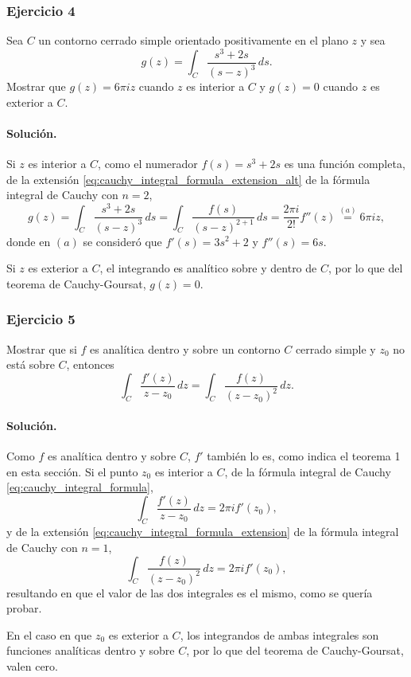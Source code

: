 \documentclass[a4paper]{report}
\begin{document}
\subsubsection*{Ejercicio 4}

Sea \(C\) un contorno cerrado simple orientado positivamente en el plano \(z\) y sea
\[
 g(z)=\int_C\frac{s^3+2s}{(s-z)^3}\,ds.
\]
Mostrar que \(g(z)=6\pi iz\) cuando \(z\) es interior a \(C\) y \(g(z)=0\) cuando \(z\) es exterior a \(C\).

\paragraph{Solución.} Si \(z\) es interior a \(C\), como el numerador \(f(s)=s^3+2s\) es una función completa, de la extensión \ref{eq:cauchy_integral_formula_extension_alt} de la fórmula integral de Cauchy con \(n=2\),
\[
 g(z)=\int_C\frac{s^3+2s}{(s-z)^3}\,ds=\int_C\frac{f(s)}{(s-z)^{2+1}}\,ds=\frac{2\pi i}{2!}f''(z)\overset{(a)}{=}6\pi iz,
\]
donde en \((a)\) se consideró que \(f'(s)=3s^2+2\) y \(f''(s)=6s\).

Si \(z\) es exterior a \(C\), el integrando es analítico sobre y dentro de \(C\), por lo que del teorema de Cauchy-Goursat, \(g(z)=0\).

\subsubsection*{Ejercicio 5}

Mostrar que si \(f\) es analítica dentro y sobre un contorno \(C\) cerrado simple y \(z_0\) no está sobre \(C\), entonces
\[
 \int_C\frac{f'(z)}{z-z_0}\,dz=\int_C\frac{f(z)}{(z-z_0)^2}\,dz.
\]

\paragraph{Solución.} Como \(f\) es analítica dentro y sobre \(C\), \(f'\) también lo es, como indica el teorema 1 en esta sección. Si el punto \(z_0\) es interior a \(C\), de la fórmula integral de Cauchy \ref{eq:cauchy_integral_formula},
\[
 \int_C\frac{f'(z)}{z-z_0}\,dz=2\pi if'(z_0),
\]
y de la extensión \ref{eq:cauchy_integral_formula_extension} de la fórmula integral de Cauchy con \(n=1\),
\[
 \int_C\frac{f(z)}{(z-z_0)^2}\,dz=2\pi if'(z_0),
\]
resultando en que el valor de las dos integrales es el mismo, como se quería probar.

En el caso en que \(z_0\) es exterior a \(C\), los integrandos de ambas integrales son funciones analíticas dentro y sobre \(C\), por lo que del teorema de Cauchy-Goursat, valen cero.
\end{document}
